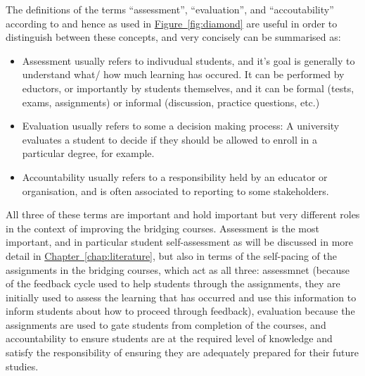 \documentclass[twoside,12pt,a4paper]{report}
\newcommand{\refchap}[1]{\hyperref[chap:#1]{Chapter~\ref{chap:#1}}}
\newcommand{\reffig}[1]{\hyperref[fig:#1]{Figure~\ref{fig:#1}}}
\begin{document}
The definitions of the terms ``assessment'', ``evaluation'', and ``accoutability'' according to  and hence as used in \reffig{diamond} are useful in order to distinguish between these concepts, and very concisely can be summarised as:
\begin{itemize}
	\item Assessment usually refers to indivudual students, and it's goal is generally to understand what/ how much learning has occured. It can be performed by eductors, or importantly by students themselves, and it can be formal (tests, exams, assignments) or informal (discussion, practice questions, etc.)
	\item Evaluation usually refers to some a decision making process: A university evaluates a student to decide if they should be allowed to enroll in a particular degree, for example.
	\item Accountability usually refers to a responsibility held by an educator or organisation, and is often associated to reporting to some stakeholders. 
\end{itemize}
All three of these terms are important and hold important but very different roles in the context of improving the bridging courses. Assessment is the most important, and in particular student self-assessment as will be discussed in more detail in \refchap{literature}, but also in terms of the self-pacing of the assignments in the bridging courses, which act as all three: assessmnet (because of the feedback cycle used to help students through the assignments, they are initially used to assess the learning that has occurred and use this information to inform students about how to proceed through feedback), evaluation because the assignments are used to gate students from completion of the courses, and accountability to ensure students are at the required level of knowledge and satisfy the responsibility of ensuring they are adequately prepared for their future studies. 
\end{document}
